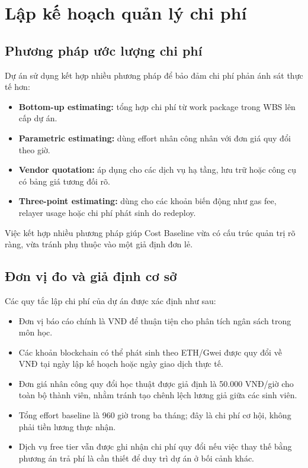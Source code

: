 \section{Lập kế hoạch quản lý chi phí}

\subsection{Phương pháp ước lượng chi phí}

Dự án sử dụng kết hợp nhiều phương pháp để bảo đảm chi phí phản ánh sát thực tế hơn:

\begin{itemize}
  \item \textbf{Bottom-up estimating:} tổng hợp chi phí từ work package trong WBS lên cấp dự án.
  \item \textbf{Parametric estimating:} dùng effort nhân công nhân với đơn giá quy đổi theo giờ.
  \item \textbf{Vendor quotation:} áp dụng cho các dịch vụ hạ tầng, lưu trữ hoặc công cụ có bảng giá tương đối rõ.
  \item \textbf{Three-point estimating:} dùng cho các khoản biến động như gas fee, relayer usage hoặc chi phí phát sinh do redeploy.
\end{itemize}

Việc kết hợp nhiều phương pháp giúp Cost Baseline vừa có cấu trúc quản trị rõ ràng, vừa tránh phụ thuộc vào một giả định đơn lẻ.

\subsection{Đơn vị đo và giả định cơ sở}

Các quy tắc lập chi phí của dự án được xác định như sau:

\begin{itemize}
  \item Đơn vị báo cáo chính là VNĐ để thuận tiện cho phân tích ngân sách trong môn học.
  \item Các khoản blockchain có thể phát sinh theo ETH/Gwei được quy đổi về VNĐ tại ngày lập kế hoạch hoặc ngày giao dịch thực tế.
  \item Đơn giá nhân công quy đổi học thuật được giả định là 50.000 VNĐ/giờ cho toàn bộ thành viên, nhằm tránh tạo chênh lệch lương giả giữa các sinh viên.
  \item Tổng effort baseline là 960 giờ trong ba tháng; đây là chi phí cơ hội, không phải tiền lương thực nhận.
  \item Dịch vụ free tier vẫn được ghi nhận chi phí quy đổi nếu việc thay thế bằng phương án trả phí là cần thiết để duy trì dự án ở bối cảnh khác.
\end{itemize}

